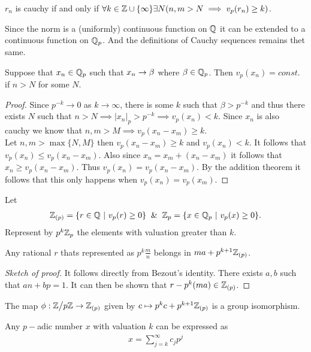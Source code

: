 \begin{corollary}
  $r_n$ is cauchy if and only if $\forall k\in \mathbb{Z}\cup\{\infty\} \exists N(n,m>N\implies v_p(r_n) \geq k)$.
\end{corollary}
\begin{remark}
  Since the norm is a (uniformly) continuous function on $\mathbb{Q}$ it can be extended to a continuous function on $\mathbb{Q}_p$. And the definitions of Cauchy sequences remains thet same.
\end{remark}
\begin{proposition}
  Suppose that $x_n\in \mathbb{Q}_p$ such that $x_n \to \beta$ where $\beta\in \mathbb{Q}_p$. Then $v_p(x_n) = const.$ if $n>N$ for some $N$.
\end{proposition}
\begin{proof}
  Since $p^{-k} \to 0$ as $k\to \infty$, there is some $k$ such that $\beta > p^{-k}$ and thus there exists $N$ such that $n>N \implies |x_n|_p > p^{-k}\implies v_p(x_n) < k$. Since $x_n$ is also cauchy we know that $n,m>M \implies v_p(x_n - x_m) \geq k$.\\

  Let $n,m>\max\{N,M\}$ then $v_p(x_n-x_m)\geq k$ and $v_p(x_n) < k$. It follows that $v_p(x_n) \leq v_p(x_n-x_m)$. Also since $x_n = x_m + (x_n -x_m)$ it follows that $x_n\geq v_p(x_n - x_m)$. Thus $v_p(x_n) = v_p(x_n - x_m)$. By the addition theorem it follows that this only happens when $v_p(x_n) = v_p(x_m)$. 
\end{proof}
\begin{definition}
  Let
  \begin{align*}
    \Z_{(p)} = \{r\in \Q\ |\ v_p(r)\geq 0\} \And \Z_p = \{x\in \Q_p\ |\ v_p(x)\geq 0\}.
  \end{align*}
  Represent by $p^k\mathbb{Z}_p$ the elements with valuation greater than $k$.
\end{definition}
\begin{proposition}
  Any rational $r$ thats represented as $p^k \frac{m}{n}$ belongs in $ma+p^{k+1}\mathbb{Z}_{(p)}$.
\end{proposition}
\begin{proof}[Sketch of proof]
  It follows directly from Bezout's identity. There exists $a,b$ such that $an+bp =1$. It can then be shown that $r - p^k(ma) \in \mathbb{Z}_{(p)}$.
\end{proof}
\begin{theorem}
  The map $\p: \Z\bign/p\Z \to \Z_{(p)}$ given by $c\mapsto p^k c + p^{k+1}\mathbb{Z}_{(p)}$ is a group isomorphism.
\end{theorem}
\begin{theorem}
  Any $p-$adic number $x$ with valuation $k$ can be expressed as
  \begin{align*}
    x = \sum_{j=k}^\infty c_j p^j
  \end{align*}
\end{theorem}
